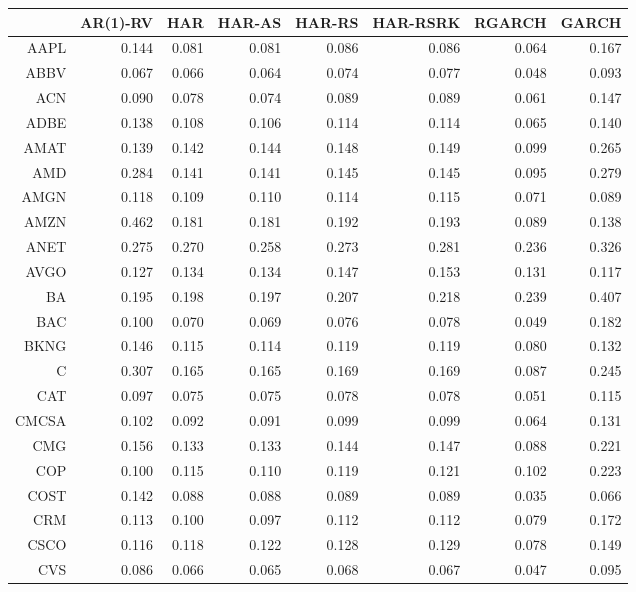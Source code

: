 \begin{table}[ht]
\centering
\begin{tabular}{rrrrrrrr}
  \hline
 & AR(1)-RV & HAR & HAR-AS & HAR-RS & HAR-RSRK & RGARCH & GARCH \\ 
  \hline
AAPL & 0.144 & 0.081 & 0.081 & 0.086 & 0.086 & 0.064 & 0.167 \\ 
  ABBV & 0.067 & 0.066 & 0.064 & 0.074 & 0.077 & 0.048 & 0.093 \\ 
  ACN & 0.090 & 0.078 & 0.074 & 0.089 & 0.089 & 0.061 & 0.147 \\ 
  ADBE & 0.138 & 0.108 & 0.106 & 0.114 & 0.114 & 0.065 & 0.140 \\ 
  AMAT & 0.139 & 0.142 & 0.144 & 0.148 & 0.149 & 0.099 & 0.265 \\ 
  AMD & 0.284 & 0.141 & 0.141 & 0.145 & 0.145 & 0.095 & 0.279 \\ 
  AMGN & 0.118 & 0.109 & 0.110 & 0.114 & 0.115 & 0.071 & 0.089 \\ 
  AMZN & 0.462 & 0.181 & 0.181 & 0.192 & 0.193 & 0.089 & 0.138 \\ 
  ANET & 0.275 & 0.270 & 0.258 & 0.273 & 0.281 & 0.236 & 0.326 \\ 
  AVGO & 0.127 & 0.134 & 0.134 & 0.147 & 0.153 & 0.131 & 0.117 \\ 
  BA & 0.195 & 0.198 & 0.197 & 0.207 & 0.218 & 0.239 & 0.407 \\ 
  BAC & 0.100 & 0.070 & 0.069 & 0.076 & 0.078 & 0.049 & 0.182 \\ 
  BKNG & 0.146 & 0.115 & 0.114 & 0.119 & 0.119 & 0.080 & 0.132 \\ 
  C & 0.307 & 0.165 & 0.165 & 0.169 & 0.169 & 0.087 & 0.245 \\ 
  CAT & 0.097 & 0.075 & 0.075 & 0.078 & 0.078 & 0.051 & 0.115 \\ 
  CMCSA & 0.102 & 0.092 & 0.091 & 0.099 & 0.099 & 0.064 & 0.131 \\ 
  CMG & 0.156 & 0.133 & 0.133 & 0.144 & 0.147 & 0.088 & 0.221 \\ 
  COP & 0.100 & 0.115 & 0.110 & 0.119 & 0.121 & 0.102 & 0.223 \\ 
  COST & 0.142 & 0.088 & 0.088 & 0.089 & 0.089 & 0.035 & 0.066 \\ 
  CRM & 0.113 & 0.100 & 0.097 & 0.112 & 0.112 & 0.079 & 0.172 \\ 
  CSCO & 0.116 & 0.118 & 0.122 & 0.128 & 0.129 & 0.078 & 0.149 \\ 
  CVS & 0.086 & 0.066 & 0.065 & 0.068 & 0.067 & 0.047 & 0.095 \\ 

\end{tabular}
\end{table}
